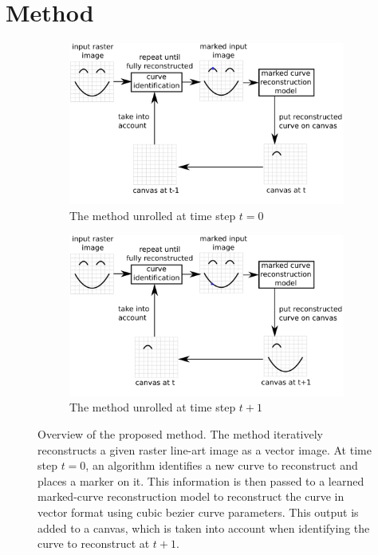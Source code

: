 \section{Method}
\label{sec:model}
\begin{figure}
    \centering
    \begin{subfigure}{\textwidth}
        \includegraphics[width=\textwidth]{graphics/abstract_overview.pdf}
        \caption{The method unrolled at time step $t=0$}
    \end{subfigure}
    \begin{subfigure}{\textwidth}
        \includegraphics[width=\textwidth]{graphics/abstract_overview_2.pdf}
        \caption{The method unrolled at time step $t+1$}
    \end{subfigure}
    \caption{Overview of the proposed method. The method iteratively reconstructs a given raster line-art image as a vector image. At time step $t=0$, an algorithm identifies a new curve to reconstruct and places a marker on it. This information is then passed to a learned marked-curve reconstruction model to reconstruct the curve in vector format using cubic bezier curve parameters. This output is added to a canvas, which is taken into account when identifying the curve to reconstruct at $t+1$.}
    \label{fig:model.arch}
\end{figure}

